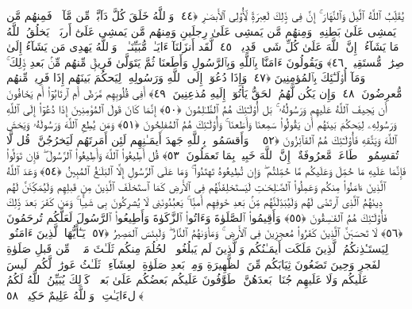  يُقَلِّبُ ٱللَّهُ ٱلَّيلَ وَٱلنَّهَارَ ۚ إِنَّ فِى ذَٟلِكَ لَعِبرَةًۭ لِّأُو۟لِى ٱلأَبصَـٰرِ ﴿٤٤﴾
 وَٱللَّهُ خَلَقَ كُلَّ دَآبَّةٍۢ مِّن مَّآءٍۢ ۖ فَمِنهُم مَّن يَمشِى عَلَىٰ بَطنِهِۦ وَمِنهُم مَّن يَمشِى عَلَىٰ رِجلَينِ وَمِنهُم مَّن يَمشِى عَلَىٰٓ أَربَعٍۢ ۚ يَخلُقُ ٱللَّهُ مَا يَشَآءُ ۚ إِنَّ ٱللَّهَ عَلَىٰ كُلِّ شَىءٍۢ قَدِيرٌۭ ﴿٤٥﴾
 لَّقَد أَنزَلنَآ ءَايَـٰتٍۢ مُّبَيِّنَـٰتٍۢ ۚ وَٱللَّهُ يَهدِى مَن يَشَآءُ إِلَىٰ صِرَٰطٍۢ مُّستَقِيمٍۢ ﴿٤٦﴾
 وَيَقُولُونَ ءَامَنَّا بِٱللَّهِ وَبِٱلرَّسُولِ وَأَطَعنَا ثُمَّ يَتَوَلَّىٰ فَرِيقٌۭ مِّنهُم مِّنۢ بَعدِ ذَٟلِكَ ۚ وَمَآ أُو۟لَـٰٓئِكَ بِٱلمُؤمِنِينَ ﴿٤٧﴾
 وَإِذَا دُعُوٓا۟ إِلَى ٱللَّهِ وَرَسُولِهِۦ لِيَحكُمَ بَينَهُم إِذَا فَرِيقٌۭ مِّنهُم مُّعرِضُونَ ﴿٤٨﴾
 وَإِن يَكُن لَّهُمُ ٱلحَقُّ يَأتُوٓا۟ إِلَيهِ مُذعِنِينَ ﴿٤٩﴾
 أَفِى قُلُوبِهِم مَّرَضٌ أَمِ ٱرتَابُوٓا۟ أَم يَخَافُونَ أَن يَحِيفَ ٱللَّهُ عَلَيهِم وَرَسُولُهُۥ ۚ بَل أُو۟لَـٰٓئِكَ هُمُ ٱلظَّـٰلِمُونَ ﴿٥٠﴾
 إِنَّمَا كَانَ قَولَ ٱلمُؤمِنِينَ إِذَا دُعُوٓا۟ إِلَى ٱللَّهِ وَرَسُولِهِۦ لِيَحكُمَ بَينَهُم أَن يَقُولُوا۟ سَمِعنَا وَأَطَعنَا ۚ وَأُو۟لَـٰٓئِكَ هُمُ ٱلمُفلِحُونَ ﴿٥١﴾
 وَمَن يُطِعِ ٱللَّهَ وَرَسُولَهُۥ وَيَخشَ ٱللَّهَ وَيَتَّقهِ فَأُو۟لَـٰٓئِكَ هُمُ ٱلفَآئِزُونَ ﴿٥٢﴾
 ۞ وَأَقسَمُوا۟ بِٱللَّهِ جَهدَ أَيمَـٰنِهِم لَئِن أَمَرتَهُم لَيَخرُجُنَّ ۖ قُل لَّا تُقسِمُوا۟ ۖ طَاعَةٌۭ مَّعرُوفَةٌ ۚ إِنَّ ٱللَّهَ خَبِيرٌۢ بِمَا تَعمَلُونَ ﴿٥٣﴾
 قُل أَطِيعُوا۟ ٱللَّهَ وَأَطِيعُوا۟ ٱلرَّسُولَ ۖ فَإِن تَوَلَّوا۟ فَإِنَّمَا عَلَيهِ مَا حُمِّلَ وَعَلَيكُم مَّا حُمِّلتُم ۖ وَإِن تُطِيعُوهُ تَهتَدُوا۟ ۚ وَمَا عَلَى ٱلرَّسُولِ إِلَّا ٱلبَلَـٰغُ ٱلمُبِينُ ﴿٥٤﴾
 وَعَدَ ٱللَّهُ ٱلَّذِينَ ءَامَنُوا۟ مِنكُم وَعَمِلُوا۟ ٱلصَّـٰلِحَـٰتِ لَيَستَخلِفَنَّهُم فِى ٱلأَرضِ كَمَا ٱستَخلَفَ ٱلَّذِينَ مِن قَبلِهِم وَلَيُمَكِّنَنَّ لَهُم دِينَهُمُ ٱلَّذِى ٱرتَضَىٰ لَهُم وَلَيُبَدِّلَنَّهُم مِّنۢ بَعدِ خَوفِهِم أَمنًۭا ۚ يَعبُدُونَنِى لَا يُشرِكُونَ بِى شَيـًۭٔا ۚ وَمَن كَفَرَ بَعدَ ذَٟلِكَ فَأُو۟لَـٰٓئِكَ هُمُ ٱلفَـٰسِقُونَ ﴿٥٥﴾
 وَأَقِيمُوا۟ ٱلصَّلَوٰةَ وَءَاتُوا۟ ٱلزَّكَوٰةَ وَأَطِيعُوا۟ ٱلرَّسُولَ لَعَلَّكُم تُرحَمُونَ ﴿٥٦﴾
 لَا تَحسَبَنَّ ٱلَّذِينَ كَفَرُوا۟ مُعجِزِينَ فِى ٱلأَرضِ ۚ وَمَأوَىٰهُمُ ٱلنَّارُ ۖ وَلَبِئسَ ٱلمَصِيرُ ﴿٥٧﴾
 يَـٰٓأَيُّهَا ٱلَّذِينَ ءَامَنُوا۟ لِيَستَـٔذِنكُمُ ٱلَّذِينَ مَلَكَت أَيمَـٰنُكُم وَٱلَّذِينَ لَم يَبلُغُوا۟ ٱلحُلُمَ مِنكُم ثَلَـٰثَ مَرَّٟتٍۢ ۚ مِّن قَبلِ صَلَوٰةِ ٱلفَجرِ وَحِينَ تَضَعُونَ ثِيَابَكُم مِّنَ ٱلظَّهِيرَةِ وَمِنۢ بَعدِ صَلَوٰةِ ٱلعِشَآءِ ۚ ثَلَـٰثُ عَورَٰتٍۢ لَّكُم ۚ لَيسَ عَلَيكُم وَلَا عَلَيهِم جُنَاحٌۢ بَعدَهُنَّ ۚ طَوَّٰفُونَ عَلَيكُم بَعضُكُم عَلَىٰ بَعضٍۢ ۚ كَذَٟلِكَ يُبَيِّنُ ٱللَّهُ لَكُمُ ٱلءَايَـٰتِ ۗ وَٱللَّهُ عَلِيمٌ حَكِيمٌۭ ﴿٥٨﴾
